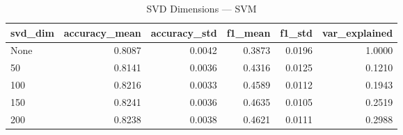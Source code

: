 \begin{table}
\caption{SVD Dimensions — SVM}
\begin{tabular}{lrrrrr}
\toprule
svd_dim & accuracy_mean & accuracy_std & f1_mean & f1_std & var_explained \\
\midrule
None & 0.8087 & 0.0042 & 0.3873 & 0.0196 & 1.0000 \\
50 & 0.8141 & 0.0036 & 0.4316 & 0.0125 & 0.1210 \\
100 & 0.8216 & 0.0033 & 0.4589 & 0.0112 & 0.1943 \\
150 & 0.8241 & 0.0036 & 0.4635 & 0.0105 & 0.2519 \\
200 & 0.8238 & 0.0038 & 0.4621 & 0.0111 & 0.2988 \\
\bottomrule
\end{tabular}
\end{table}
